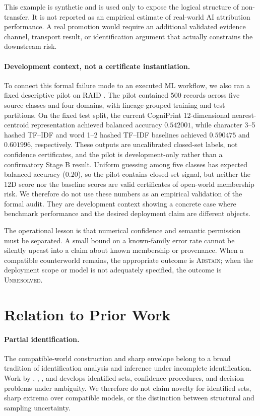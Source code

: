 \documentclass[10pt]{article}
\begin{document}
This example is synthetic and is used only to expose the logical structure of
non-transfer.  It is not reported as an empirical estimate of real-world AI
attribution performance.  A real promotion would require an additional
validated evidence channel, transport result, or identification argument that
actually constrains the downstream risk.


\paragraph{Development context, not a certificate instantiation.}
To connect this formal failure mode to an executed ML workflow, we also ran a
fixed descriptive pilot on RAID \citep{DuganEtAl2024RAID}.  The pilot contained
500 records across five source classes and four domains, with lineage-grouped
training and test partitions.  On the fixed test split, the current CogniPrint
12-dimensional nearest-centroid representation achieved balanced accuracy
\(0.542001\), while character 3--5 hashed TF--IDF and word 1--2 hashed TF--IDF
baselines achieved \(0.590475\) and \(0.601996\), respectively.  These outputs
are uncalibrated closed-set labels, not confidence certificates, and the pilot
is development-only rather than a confirmatory Stage B result.  Uniform guessing among five classes has expected balanced accuracy (0.20),
so the pilot contains closed-set signal, but neither the 12D score nor the
baseline scores are valid certificates of open-world membership risk.  We
therefore do not use these numbers as an empirical validation of the formal
audit.  They are development context showing a concrete case where benchmark
performance and the desired deployment claim are different objects.

The operational lesson is that numerical confidence and semantic permission
must be separated.  A small bound on a known-family error rate cannot be
silently upcast into a claim about known membership or provenance.  When a
compatible counterworld remains, the appropriate outcome is
\textsc{Abstain}; when the deployment scope or model is not adequately
specified, the outcome is \textsc{Unresolved}.

\section{Relation to Prior Work}

\paragraph{Partial identification.}
The compatible-world construction and sharp envelope belong to a broad
tradition of identification analysis and inference under incomplete
identification.  Work by \citet{Manski2000},
\citet{ImbensManski2004}, \citet{ChernozhukovHongTamer2007}, and
\citet{Stoye2009} develops identified sets, confidence procedures, and
decision problems under ambiguity.  We therefore do not claim novelty for
identified sets, sharp extrema over compatible models, or the distinction
between structural and sampling uncertainty.
\end{document}
